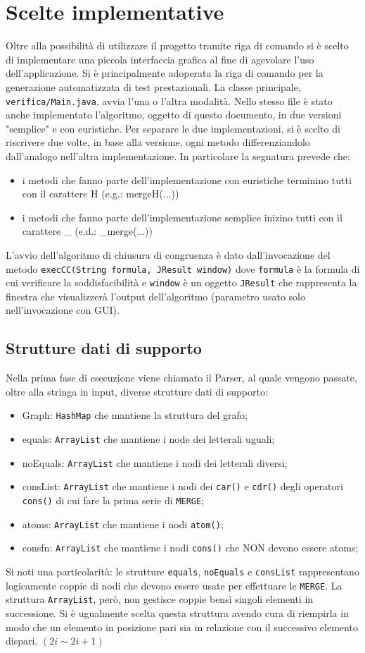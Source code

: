 \documentclass[a4paper,11pt]{article}
\begin{document}
\section{Scelte implementative}
Oltre alla possibilità di utilizzare il progetto tramite riga di comando si è scelto di implementare una piccola interfaccia grafica al fine di agevolare l'uso dell'applicazione.
Si è principalmente adoperata la riga di comando per la generazione automatizzata di test prestazionali.
La classe principale, {\tt verifica/Main.java}, avvia l'una o l'altra modalità.
Nello stesso file è stato anche implementato l'algoritmo, oggetto di questo documento, in due versioni "semplice" e con euristiche.
Per separare le due implementazioni, si è scelto di riscrivere due volte, in base alla versione, ogni metodo differenziandolo dall'analogo nell'altra implementazione.
In particolare la segnatura prevede che:
\begin{itemize}
	\item i metodi che fanno parte dell'implementazione con euristiche terminino tutti con il carattere H (e.g.: mergeH(...))
	\item i metodi che fanno parte dell'implementazione semplice inizino tutti con il carattere \_ (e.d.: \_merge(...))
\end{itemize}
L'avvio dell'algoritmo di chiusura di congruenza è dato dall'invocazione del metodo  
{\tt execCC(String formula, JResult window)}
dove {\tt formula} è la formula di cui verificare la soddisfacibilità e {\tt window} è un oggetto {\tt JResult} che rappresenta la finestra che visualizzerà l'output dell'algoritmo (parametro usato solo nell'invocazione con GUI).
\subsection{Strutture dati di supporto}
Nella prima fase di esecuzione viene chiamato il Parser, al quale vengono passate, oltre alla stringa in input, diverse strutture dati di supporto:
\begin{itemize}
	\item Graph: {\tt HashMap} che mantiene la struttura del grafo;
	\item equals: {\tt ArrayList} che mantiene i node dei letterali uguali;
	\item noEquals: {\tt ArrayList} che mantiene i nodi dei letterali diversi;
	\item consList: {\tt ArrayList} che mantiene i nodi dei {\tt car()} e {\tt cdr()} degli operatori {\tt cons()} di cui fare la prima serie di {\tt MERGE};
	\item atoms: {\tt ArrayList} che mantiene i nodi {\tt atom()};
	\item consfn: {\tt ArrayList} che mantiene i nodi {\tt cons()} che NON devono essere atoms; 
\end{itemize}
Si noti una particolarità: le strutture {\tt equals}, {\tt noEquals} e {\tt consList} rappresentano logicamente coppie di nodi che devono essere usate per effettuare le {\tt MERGE}.
La struttura {\tt ArrayList}, però, non gestisce coppie bensì singoli elementi in successione.
Si è ugualmente scelta questa struttura avendo cura di riempirla in modo che un elemento in posizione pari sia in relazione con il successivo elemento dispari. $(2i \sim 2i+1)$
\end{document}
